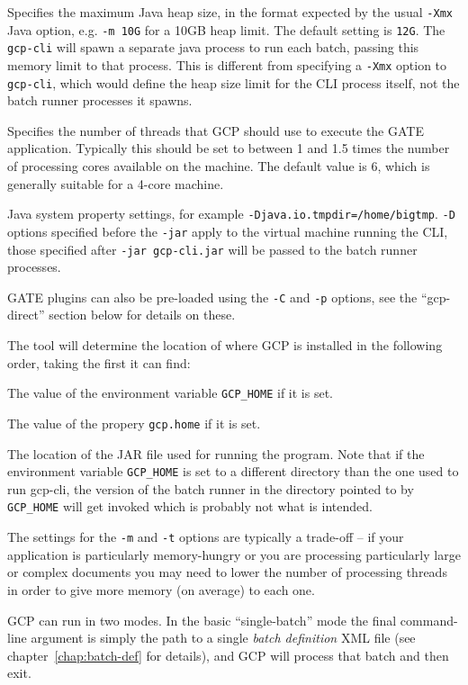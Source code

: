 \bde
\item[-m] Specifies the maximum Java heap size, in the format expected by the
  usual \verb!-Xmx! Java option, e.g. \verb!-m 10G! for a 10GB heap limit.  The
  default setting is \verb!12G!.  The \verb!gcp-cli! will spawn a separate java
  process to run each batch, passing this memory limit to that process.  This
  is different from specifying a \verb!-Xmx! option to \verb!gcp-cli!, which
  would define the heap size limit for the CLI process itself, not the batch
  runner processes it spawns.
\item[-t] Specifies the number of threads that GCP should use to execute the
  GATE application.  Typically this should be set to between 1 and 1.5 times
  the number of processing cores available on the machine.  The default value
  is 6, which is generally suitable for a 4-core machine.
\item[-D] Java system property settings, for example
  \verb!-Djava.io.tmpdir=/home/bigtmp!.  \verb!-D! options specified before the
  \verb!-jar! apply to the virtual machine running the CLI, those specified
  after \verb!-jar gcp-cli.jar! will be passed to the batch runner processes.
\ede

GATE plugins can also be pre-loaded using the \verb!-C! and \verb!-p! options,
see the ``gcp-direct'' section below for details on these.

The tool will determine the location of where GCP is installed in the 
following order, taking the first it can find:
\ben
\item The value of the environment variable \verb!GCP_HOME! if it is set.
\item The value of the propery  \verb!gcp.home! if it is set.
\item The location of the JAR file used for running the program.
\een
Note that if the environment variable \verb!GCP_HOME! is set to a different
directory than the one used to run gcp-cli, the version of 
the batch runner in the directory pointed to by \verb!GCP_HOME! will get invoked
which is probably not what is intended.

The settings for the \verb!-m! and \verb!-t! options are typically a trade-off
-- if your application is particularly memory-hungry or you are processing
particularly large or complex documents you may need to lower the number of
processing threads in order to give more memory (on average) to each one.

GCP can run in two modes.  In the basic ``single-batch'' mode the final
command-line argument is simply the path to a single {\em batch definition} XML
file (see chapter~\ref{chap:batch-def} for details), and GCP will process that
batch and then exit.

